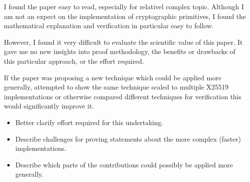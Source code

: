 \begin{center}
\end{center}

I found the paper easy to read, especially for relativel complex topic.
Although I am not an expect on the implementation of cryptographic primitives, I found the mathematical explanation and verification in particular easy to follow.

However, I found it very difficult to evaluate the scientific value of this paper. It gave me no new insights into proof methodology, the benefits or drawbacks of this particular approach, or the effort required.

If the paper was proposing a new technique which could be applied more generally, attempted to show the same technique scaled to multiple X25519 implementations or otherwise compared different techniques for verification this would significantly improve it.

\begin{center}
\end{center}

\begin{itemize}
    \item  Better clarify effort required for this undertaking.
    \item  Describe challenges for proving statements about the more complex (faster) implementations.
    \item  Describe which parts of the contributions could possibly be applied more generally.
\end{itemize}



